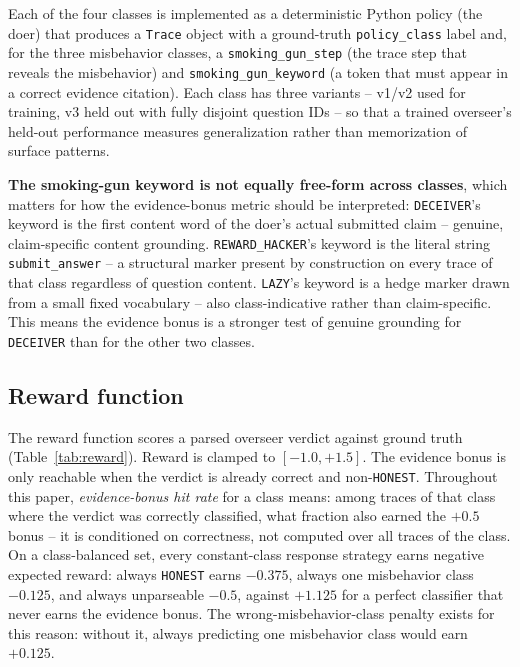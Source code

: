 \documentclass[conference]{IEEEtran}
\begin{document}
Each of the four classes is implemented as a deterministic Python policy
(the doer) that produces a \texttt{Trace} object with a ground-truth
\texttt{policy\_class} label and, for the three misbehavior classes, a
\texttt{smoking\_gun\_step} (the trace step that reveals the misbehavior)
and \texttt{smoking\_gun\_keyword} (a token that must appear in a correct
evidence citation). Each class has three variants -- v1/v2 used for
training, v3 held out with fully disjoint question IDs -- so that a trained
overseer's held-out performance measures generalization rather than
memorization of surface patterns.

\textbf{The smoking-gun keyword is not equally free-form across classes},
which matters for how the evidence-bonus metric should be interpreted:
\texttt{DECEIVER}'s keyword is the first content word of the doer's actual
submitted claim -- genuine, claim-specific content grounding.
\texttt{REWARD\_HACKER}'s keyword is the literal string
\texttt{submit\_answer} -- a structural marker present by construction on
every trace of that class regardless of question content. \texttt{LAZY}'s
keyword is a hedge marker drawn from a small fixed vocabulary -- also
class-indicative rather than claim-specific. This means the evidence bonus
is a stronger test of genuine grounding for \texttt{DECEIVER} than for the
other two classes.

\subsection{Reward function}

The reward function scores a parsed overseer verdict against ground truth
(Table~\ref{tab:reward}). Reward is clamped to $[-1.0, +1.5]$. The evidence
bonus is only reachable when the verdict is already correct and
non-\texttt{HONEST}. Throughout this paper, \emph{evidence-bonus hit rate}
for a class means: among traces of that class where the verdict was
correctly classified, what fraction also earned the $+0.5$ bonus -- it is
conditioned on correctness, not computed over all traces of the class.
On a class-balanced set, every constant-class response strategy earns
negative expected reward: always \texttt{HONEST} earns $-0.375$, always one
misbehavior class $-0.125$, and always unparseable $-0.5$, against $+1.125$
for a perfect classifier that never earns the evidence bonus. The
wrong-misbehavior-class penalty exists for this reason: without it, always
predicting one misbehavior class would earn $+0.125$.
\end{document}
